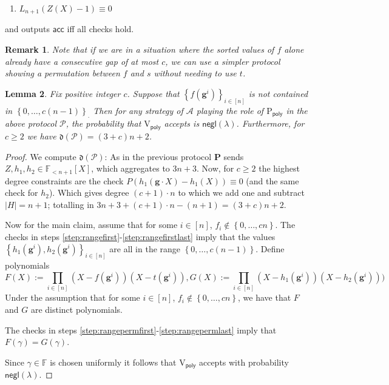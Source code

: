 \documentclass[11pt]{article} %
\newcommand{\F}{\ensuremath{\mathbb F}\xspace}
\newcommand{\adv}{\ensuremath{\mathcal A}\xspace}
\newcommand{\negl}{\ensuremath{\mathsf{negl}(\lambda)}\xspace}
\newcommand{\acc}{\ensuremath{\mathsf{acc}}\xspace}
\newcommand{\defeq}{:=}
\newcommand{\sett}[2]{\ensuremath{\set{#1}_{#2}}\xspace}
\newcommand{\prv}{\ensuremath{\mathsf{\mathbf{P}}}\xspace}
\newcommand{\prvpoly}{\ensuremath{\mathrm{P_{\mathsf{poly}}}}\xspace}
\newcommand{\verpoly}{\ensuremath{\mathrm{V_{\mathsf{poly}}}}\xspace}
\newcommand{\set}[1]{\ensuremath{\left\{#1\right\}}\xspace}
\newcommand{\hgen}{\ensuremath{\mathbf{g}}\xspace}
\newcommand{\polysofdeg}[1]{\ensuremath{\F_{< #1}[X]}\xspace}
\newcommand{\prot}{\ensuremath{\mathscr{P}}\xspace}
\newcommand{\aggdeg}[1]{\ensuremath{\mathfrak{d}(#1)}\xspace}
\newtheorem{lemma}{Lemma}[section]
\newtheorem{remark}[lemma]{Remark}
\newcommand{\sone}{\ensuremath{ h_1}\xspace}
\newcommand{\stwo}{\ensuremath{ h_{2}}\xspace}
\begin{document}
\begin{enumerate}
\begin{enumerate}
\item \label{step:rangepermlast}$L_{n+1}(Z(X)-1)\equiv 0$
 
 \end{enumerate}

 and outputs \acc iff all checks hold.
\end{enumerate}
\begin{remark}
 Note that if we are in a situation where the sorted values of $f$ alone already have a consecutive gap of at most $c$, we can use a simpler protocol showing a permutation between $f$ and $s$ without needing to use $t$.
\end{remark}



\begin{lemma}\label{lem:rangeprot}
Fix positive integer $c$.
 Suppose that $\sett{f(\hgen^i)}{i\in [n]}$ is not contained in  \sett{0,\ldots,c(n-1)}.
 Then for any strategy of \adv playing the role of \prvpoly in the above protocol \prot, the probability that \verpoly accepts is \negl.
 Furthermore, for $c\geq 2$ we have $\aggdeg{\prot} = (3+c)n+2$.
\end{lemma}


\begin{proof}
 We compute \aggdeg{\prot}:
 As in the previous protocol \prv sends $Z,\sone,\stwo \in \polysofdeg{n+1}$,
 which aggregates to $3n+3$.
 Now, for $c\geq 2$ the highest degree constraints are the check
 $P\left(\sone(\hgen\cdot X)- \sone(X)\right)\equiv 0$ (and the same check for \stwo).
 Which gives degree $(c+1)\cdot n$ to which we add one and subtract $|H|=n+1$;
 totalling in $3n+3+(c+1)\cdot n - (n+1) = (3+c)n+2$.
 
 Now for the main claim, assume that for some $i\in [n]$, $f_i \notin \set{0,\ldots,cn}$.
 The checks in steps \ref{step:rangefirst}-\ref{step:rangefirstlast} imply 
 that the values \sett{\sone(\hgen^i),\stwo(\hgen^i)}{i\in [n]} are all in the range \set{0,\ldots, c(n-1)}.
 Define polynomials 
 \[F(X) \defeq \prod_{i\in [n]} (X-f(\hgen^i))(X-t(\hgen^i)),
 G(X) \defeq \prod_{i\in [n]} (X-\sone(\hgen^i))(X-\stwo(\hgen^i)))
 \]
Under the assumption that for some $i\in [n]$, $f_i \notin \set{0,\ldots,cn}$,
we have that $F$ and $G$ are distinct polynomials.

The checks in steps \ref{step:rangepermfirst}-\ref{step:rangepermlast} imply
that $F(\gamma) = G(\gamma)$.

Since $\gamma \in \F$ is chosen uniformly it follows that \verpoly accepts with probability \negl.
 
 \end{proof}
\end{document}
